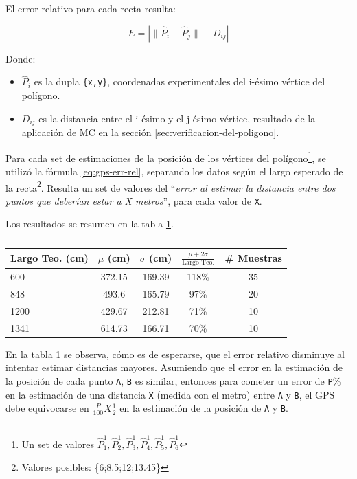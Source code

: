 \documentclass[spanish,12pt,a4paper,titlepage]{report}
\begin{document}
El error relativo para cada recta resulta:

\begin{equation}
  \label{eq:gps-err-rel}
  E = \left|\|\hat{P}_{i} - \hat{P}_{j}\| - D_{ij}\right|
\end{equation}

Donde:
\begin{itemize}
\item $\hat{P}_i$ es la dupla \verb+{x,y}+, coordenadas experimentales del i-ésimo vértice del polígono.
\item $D_{ij}$ es la distancia entre el i-ésimo y el j-ésimo vértice, resultado de la aplicación de MC en la sección \ref{sec:verificacion-del-poligono}.
\end{itemize}

Para cada set de estimaciones de la posición de los vértices del polígono\footnote{Un set de valores $\hat{P}_1^1,\hat{P}_2^1,\hat{P}_3^1,\hat{P}_4^1,\hat{P}_5^1,\hat{P}_6^1$}, se utilizó la fórmula \ref{eq:gps-err-rel}, separando los datos según el largo esperado de la recta\footnote{Valores posibles: \{6;8.5;12;13.45\}}. Resulta un set de valores del ``\textit{error al estimar la distancia entre dos puntos que deberían estar a X metros}'', para cada valor de \verb+X+. 

Los resultados se resumen en la tabla \ref{tab:err-rectas}.

\begin{table}[H]
\begin{center}
\begin{tabular}{|p{65pt}|c|c|c|c|}
\hline
\textbf{Largo Teo. (cm)} & $\mu$ (cm) & $\sigma$ (cm)  & $\frac{\mu + 2\sigma}{\text{Largo Teo.}}$ & \textbf{\# Muestras} \\
\hline
\rowcolor[gray]{0.9}
600 & 372.15 & 169.39 & 118\% & 35\\
\hline
\rowcolor[gray]{0.8}
848 & 493.6 & 165.79 & 97\%& 20\\
\hline
\rowcolor[gray]{0.9}
1200 & 429.67 & 212.81 & 71\% & 10\\
\hline
\rowcolor[gray]{0.8}
1341 & 614.73 & 166.71 & 70\% & 10\\
\hline
\end{tabular}
\caption{}
\label{tab:err-rectas}
\end{center}
\end{table}

En la tabla \ref{tab:err-rectas} se observa, cómo es de esperarse, que el error relativo disminuye al intentar estimar distancias mayores. Asumiendo que el error en la estimación de la posición de cada punto \verb+A+, \verb+B+ es similar, entonces para cometer un error de \verb+P+\% en la estimación de una distancia \verb+X+ (medida con el metro) entre \verb+A+ y \verb+B+, el GPS debe equivocarse en $\frac{P}{100}X\frac{1}{2}$ en la estimación de la posición de \verb+A+ y \verb+B+.
\end{document}
